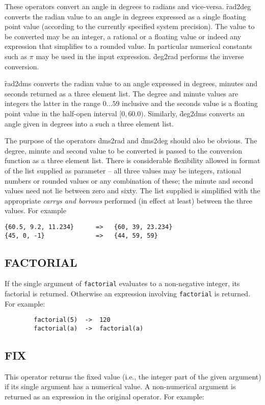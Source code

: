 These operators convert an angle in degrees to radians and vice-versa.
\f{rad2deg} converts the radian value to  an angle in degrees expressed as a single floating point value (according to the currently specified system precision).  
The value to be converted may be an integer, a rational or a floating value or indeed any expression that simplifies to a rounded value.
In particular  numerical constants such as $\pi$ may be used in the input expression.
\f{deg2rad} performs the inverse conversion.

\f{rad2dms} converts the radian value to an angle expressed in degrees, minutes and seconds returned as a three element list.  The degree and minute values are integers the latter in the range $0 \ldots 59$ inclusive and the seconds value is  a floating point value in the half-open interval $[0, 60.0)$.
Similarly, \f{deg2dms} converts an angle given in degrees into a such a three element list.

The purpose of the operators  \f{dms2rad} and \f{dms2deg} should  also be obvious.  The degree, minute and second value to be converted is passed to the conversion function as a three element list.  There is considerable flexibility allowed in  format of the list supplied as parameter -- all three values may be integers, rational numbers or rounded values or any combination of these; the minute and second values need not lie between zero and sixty.  The list supplied is simplified with the appropriate \textit{carrys and borrows} performed (in effect at least) between the three values.  For example
\begin{verbatim} 
{60.5, 9.2, 11.234}      =>   {60, 39, 23.234}
{45, 0, -1}              =>   {44, 59, 59}
\end{verbatim}

\subsection{FACTORIAL}
\hypertarget{operator:FACTORIAL}{}

If the single argument of \texttt{factorial} evaluates to a non-negative
integer, its factorial is returned.  Otherwise an expression involving
\texttt{factorial} is returned. For example:
\begin{verbatim}
        factorial(5)  ->  120
        factorial(a)  ->  factorial(a)
\end{verbatim}

\subsection{FIX}
\hypertarget{operator:FIX}{}
This operator returns the fixed value (i.e., the integer part of
the given argument) if its single argument has a numerical value.  A
non-numerical argument is returned as an expression in the original
operator.  For example:

